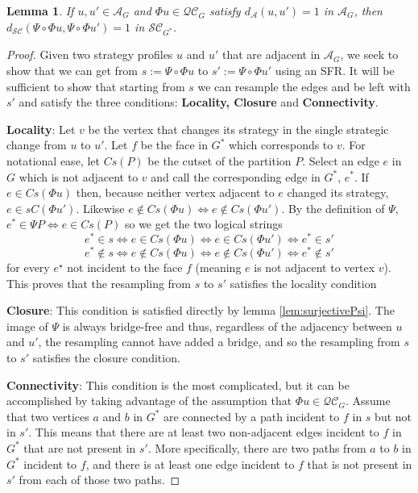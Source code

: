 \documentclass{article}
\newtheorem{lemma}{Lemma}[section]
\begin{document}
    \begin{lemma}\label{lem:MetricSimilarity}
        If $u, u'\in \mathcal{A}_G$ and $\Phi u \in \mathcal{QC}_{G}$ satisfy $d_\mathcal{A}(u,u')=1$ in $\mathcal{A}_G$, then $d_{\mathcal{SC}}(\Psi\circ\Phi u,\Psi\circ\Phi u')=1$ in $\mathcal{SC}_{G^*}$.
    \end{lemma}

    \begin{proof}
        Given two strategy profiles $u$ and $u'$ that are adjacent in $\mathcal{A}_G$, we seek to show that we can get from $s:=\Psi\circ\Phi u$ to $s':=\Psi\circ\Phi u'$ using an SFR. It will be sufficient to show that starting from $s$ we can resample the edges and be left with $s'$ and satisfy the three conditions: \textbf{Locality, Closure} and \textbf{Connectivity}.

        \textbf{Locality}: Let $v$ be the vertex that changes its strategy in the single strategic change from $u$ to $u'$. Let $f$ be the face in $G^*$ which corresponds to $v$. For notational ease, let $Cs(P)$ be the cutset of the partition $P$. Select an edge $e$ in $G$ which is not adjacent to $v$ and call the corresponding edge in $G^*$, $e^*$.
        If $e\in Cs(\Phi u)$ then, because neither vertex adjacent to $e$ changed its strategy, $e\in sC(\Phi u')$. Likewise $e\notin Cs(\Phi u)\iff e\notin Cs(\Phi u')$. By the definition of $\Psi$, $e^*\in \Psi P\iff e\in Cs(P)$ so we get the two logical strings
        \[e^*\in s\iff e\in Cs(\Phi u)\iff e\in Cs(\Phi u') \iff e^*\in s'\]
        \[e^*\notin s\iff e\notin Cs(\Phi u)\iff e\notin Cs(\Phi u') \iff e^*\notin s'\]
        for every $e^\star$ not incident to the face $f$ (meaning $e$ is not adjacent to vertex $v$). This proves that the resampling from $s$ to $s'$ satisfies the locality condition

        \textbf{Closure}: This condition is satisfied directly by lemma \ref{lem:surjectivePsi}. The image of $\Psi$ is always bridge-free and thus, regardless of the adjacency between $u$ and $u'$, the resampling cannot have added a bridge, and so the resampling from $s$ to $s'$ satisfies the closure condition. 

        \textbf{Connectivity}: This condition is the most complicated, but it can be accomplished by taking advantage of the assumption that $\Phi u\in \mathcal{QC}_G$. Assume that two vertices $a$ and $b$ in $G^*$ are connected by a path incident to $f$ in $s$ but not in $s'$. This means that there are at least two non-adjacent edges incident to $f$ in $G^*$ that are not present in $s'$. More specifically, there are two paths from $a$ to $b$ in $G^*$ incident to $f$, and there is at least one edge incident to $f$ that is not present in $s'$ from each of those two paths. 
        

\end{proof}
\end{document}

